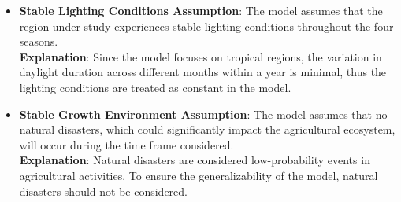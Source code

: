 \documentclass{HZNUMCM}
\begin{document}
\begin{itemize}
        \item \textbf{Stable Lighting Conditions Assumption}: The model assumes that the region under study experiences stable lighting conditions throughout the four seasons.\\
        \textbf{Explanation}: Since the model focuses on tropical regions, the variation in daylight duration across different months within a year is minimal,
         thus the lighting conditions are treated as constant in the model.
        
        \item \textbf{Stable Growth Environment Assumption}: The model assumes that no natural disasters,
         which could significantly impact the agricultural ecosystem, will occur during the time frame considered.\\
        \textbf{Explanation}: Natural disasters are considered low-probability events in agricultural activities.
         To ensure the generalizability of the model, natural disasters should not be considered.
      \end{itemize}
\end{document}
